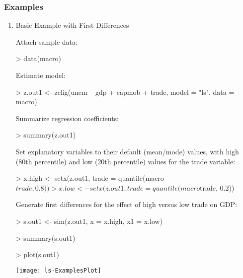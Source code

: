 \subsubsection{Examples}\begin{enumerate}
\item Basic Example with First Differences

Attach sample data:
\begin{Schunk}
\begin{Sinput}
>  data(macro)
\end{Sinput}
\end{Schunk}
Estimate model:
\begin{Schunk}
\begin{Sinput}
>  z.out1 <- zelig(unem ~ gdp + capmob + trade, model = "ls", data = macro)
\end{Sinput}
\end{Schunk}
Summarize regression coefficients:
\begin{Schunk}
\begin{Sinput}
>  summary(z.out1)
\end{Sinput}
\end{Schunk}
Set explanatory variables to their default (mean/mode) values, with
high (80th percentile) and low (20th percentile) values for the trade variable:
\begin{Schunk}
\begin{Sinput}
>  x.high <- setx(z.out1, trade = quantile(macro$trade, 0.8))
>  x.low <- setx(z.out1, trade = quantile(macro$trade, 0.2))
\end{Sinput}
\end{Schunk}
Generate first differences for the effect of high versus low trade on
GDP:
\begin{Schunk}
\begin{Sinput}
>  s.out1 <- sim(z.out1, x = x.high, x1 = x.low)
\end{Sinput}
\end{Schunk}
\begin{Schunk}
\begin{Sinput}
> summary(s.out1)
\end{Sinput}
\end{Schunk}
\begin{center}
\begin{Schunk}
\begin{Sinput}
>  plot(s.out1)
\end{Sinput}
\end{Schunk}
\texttt{[image: ls-ExamplesPlot]}
\end{center}


\end{enumerate}
